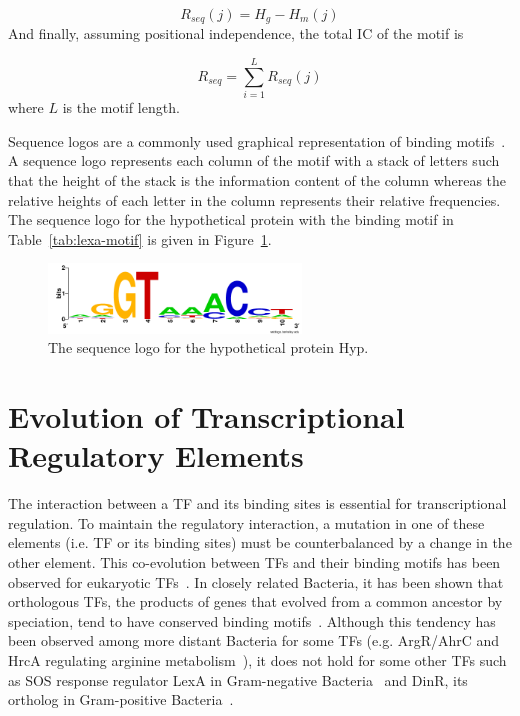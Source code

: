 \begin{equation}
  \label{eq:rseq}
  R_{seq}(j) = H_g - H_m(j)
\end{equation}
And finally, assuming positional independence, the total IC of the motif is

\begin{equation}
  \label{eq:1}
  R_{seq} = \displaystyle\sum_{i=1}^L R_{seq}(j)
\end{equation}
where $L$ is the motif length.

Sequence logos are a commonly used graphical representation of binding
motifs~\citep{schneider1990sequence, crooks2004weblogo}. A sequence logo
represents each column of the motif with a stack of letters such that the
height of the stack is the information content of the column whereas the
relative heights of each letter in the column represents their relative
frequencies. The sequence logo for the hypothetical protein with the binding
motif in Table~\ref{tab:lexa-motif} is given in Figure~\ref{fig:lexa}.

\begin{figure}
  \centering
  \includegraphics[width=0.6\textwidth]{figures/chapter1/hyp.png}
  \caption{The sequence logo for the hypothetical protein Hyp.}
  \label{fig:lexa}
\end{figure}

\section{Evolution of Transcriptional Regulatory Elements}

The interaction between a TF and its binding sites is essential for transcriptional
regulation. To maintain the regulatory interaction, a mutation in one of these
elements (i.e. TF or its binding sites) must be counterbalanced by a change in
the other element. This co-evolution between TFs and their binding motifs has
been observed for eukaryotic TFs~\citep{yang2011correlated}. In closely related
Bacteria, it has been shown that orthologous TFs, the products of genes that
evolved from a common ancestor by speciation, tend to have conserved binding
motifs~\citep{makarova2001conservation}. Although this tendency has been
observed among more distant Bacteria for some TFs (e.g. ArgR/AhrC and HrcA
regulating arginine metabolism~\citep{maas1994arginine, klingel1995binding}), it
does not hold for some other TFs such as SOS response regulator LexA in
Gram-negative Bacteria~\citep{walker1985inducible} and DinR, its ortholog in
Gram-positive Bacteria~\citep{winterling1998bacillus}.

